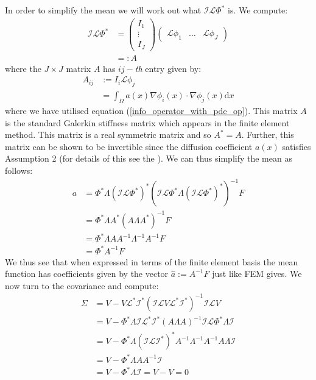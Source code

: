 In order to simplify the mean we will work out what $\mathcal{I}\mathcal{L}\Phi^{*}$ is. We compute:
\begin{align*}
    \mathcal{I}\mathcal{L}\Phi^{*} &= \begin{pmatrix}
                                        I_{1} \\
                                        \vdots \\
                                        I_{J}
                                      \end{pmatrix}
                                      \begin{pmatrix}
                                          \mathcal{L}\phi_{1} & \dots & \mathcal{L}\phi_{J}
                                      \end{pmatrix} \\
                                      &=: A
\end{align*}
where the $J\times J$ matrix $A$ has $ij-$\textit{th} entry given by:
\begin{align}
    A_{ij}&:=I_{i}\mathcal{L}\phi_{j} \\
          &= \int_{\Omega}a(x)\nabla\phi_{i}(x)\cdot\nabla\phi_{j}(x)\mathrm{d}x
\end{align}
where we have utilised equation (\ref{info_operator_with_pde_op}). This matrix $A$ is the standard Galerkin stiffness matrix which appears in the finite element method. This matrix is a real symmetric matrix and so $A^{*}=A$. Further, this matrix can be shown to be invertible since the diffusion coefficient $a(x)$ satisfies Assumption 2 (for details of this see the \textcolor{blue}{}). We can thus simplify the mean as follows:
\begin{align*}
    a &= \Phi^{*}\Lambda(\mathcal{I}\mathcal{L}\Phi^{*})^{*}(\mathcal{I}\mathcal{L}\Phi^{*}\Lambda(\mathcal{I}\mathcal{L}\Phi^{*})^{*})^{-1}F \\
    &=\Phi^{*}\Lambda A^{*}(A\Lambda A^{*})^{-1}F \\
    &=\Phi^{*}\Lambda A A^{-1} \Lambda^{-1}A^{-1}F \\
    &=\Phi^{*}A^{-1}F
\end{align*}
We thus see that when expressed in terms of the finite element basis the mean function has coefficients given by the vector $\hat{a}:=A^{-1}F$ just like FEM gives. We now turn to the covariance and compute:
\begin{align*}
    \Sigma &= V-V\mathcal{L}^{*}\mathcal{I}^{*}(\mathcal{I}\mathcal{L}V\mathcal{L}^{*}\mathcal{I}^{*})^{-1}\mathcal{I}\mathcal{L}V \\
    &= V - \Phi^{*}\Lambda\mathcal{I}\mathcal{L}^{*}\mathcal{I}^{*}(A\Lambda A)^{-1}\mathcal{I}\mathcal{L}\Phi^{*}\Lambda\mathcal{I} \\
    &=V-\Phi^{*}\Lambda(\mathcal{I}\mathcal{L}\mathcal{I}^{*})^{*}A^{-1}\Lambda^{-1}A^{-1}A\Lambda\mathcal{I} \\
    &= V - \Phi^{*}\Lambda AA^{-1}\mathcal{I} \\
    &= V - \Phi^{*}\Lambda\mathcal{I} = V-V = 0
\end{align*}
